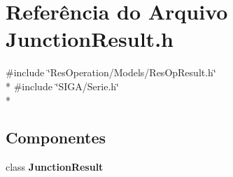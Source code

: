 \section{Referência do Arquivo Junction\+Result.\+h}
\label{_models_2_junction_2_junction_result_8h}
{\ttfamily \#include \char`\"{}Res\+Operation/\+Models/\+Res\+Op\+Result.\+h\char`\"{}}\\*
{\ttfamily \#include \char`\"{}S\+I\+G\+A/\+Serie.\+h\char`\"{}}\\*
\subsection*{Componentes}
\begin{DoxyCompactItemize}
\item 
class {\bf Junction\+Result}
\end{DoxyCompactItemize}
